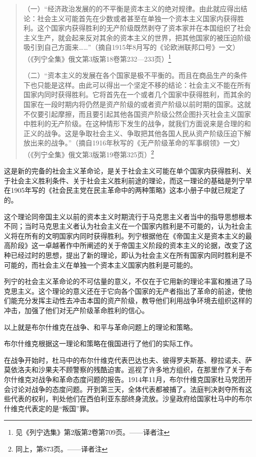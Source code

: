 \begin{quotation}
（一）“经济政治发展的的不平衡是资本主义的绝对规律。由此就应得出结论：社会主义可能首先在少数或者甚至在单独一个资本主义国家内获得胜利。这个国家内获得胜利的无产阶级既然剥夺了资本家并在本国组织了社会主义生产，就会起来反对其余的资本主义的世界，把其他国家的被压迫阶级吸引到自己方面来……”（摘自1915年8月写的《论欧洲联邦口号》一文）（《列宁全集》俄文第3版第18卷第232—233页）\footnote{见《列宁选集》第2版第2卷第709页。——译者注}

（二）“资本主义的发展在各个国家是极不平衡的。而且在商品生产的条件下也只能是这样。由此可以得出一个坚定不移的结论：社会主义不能在所有国家内同时获得胜利。它将首先在一个或者几个国家中获得胜利，而其余的国家在一段时期内将仍然是资产阶级的或者资产阶级以前时期的国家。这就不仅要引起摩擦，而且要引起其他各国资产阶级公然企图扑灭社会主义国家中胜利的无产阶级。在这种情形下发生的战争，就我们方面说来是合理的和正义的战争。这是争取社会主义、争取把其他各国人民从资产阶级压迫下解放出来的战争。”（摘自1916年秋写的《无产阶级革命的军事纲领》一文）（《列宁全集》俄文第3版第19卷第325页）\footnote{同上，第873页。——译者注}
\end{quotation}

这是新的完备的社会主义革命论，是关于社会主义可能在单个国家内获得胜利、关于社会主义胜利条件、关于社会主义胜利前途的理论，而这一理论的基础是列宁早在1905年写的《社会民主党在民主革命中的两种策略》这本小册子中就已规定了的。

这个理论同帝国主义以前的资本主义时期流行于马克思主义者当中的指导思想根本不同；当时马克思主义者认为社会主义在一个国家内胜利是不可能的，认为社会主义将在所有的文明国家内同时获得胜利。列宁根据他在《帝国主义是资本主义的最高阶段》这一卓越著作中所阐述的关于帝国主义阶段的资本主义的论据，改变了这种已经过时的思想，提出了新的理论，即认为社会主义在所有国家内同时胜利是不可能的，而社会主义在单独一个资本主义国家内胜利是可能的。

列宁的社会主义革命论的不可估量的意义，不仅在于它用新的理论丰富和推进了马克思主义。这个理论的意义还在于它向各个国家的无产者指出了革命的前途，使他们能充分发挥主动性去冲击本国的资产阶级，教导他们利用战争环境去组织这样的冲击，加强了他们对无产阶级革命胜利的信心。

以上就是布尔什维克在战争、和平与革命问题上的理论和策略。

布尔什维克根据这一理论和策略在俄国进行了他们的实际工作。

在战争开始时，杜马中的布尔什维克代表巴达也夫、彼得罗夫斯基、穆拉诺夫、萨莫依洛夫和沙果夫不顾警察的残酷迫害。巡视了许多地方组织，在那里作了关于布尔什维克对战争和革命态度问题的报告。1914年11月，布尔什维克国家杜马党团开会讨论对战争的态度问题。开到第三天，全体代表都被捕了。法庭判决剥夺所有这些代表的权利，判处他们在西伯利亚东部终身流放。沙皇政府给国家杜马中的布尔什维克代表定的是“叛国”罪。

